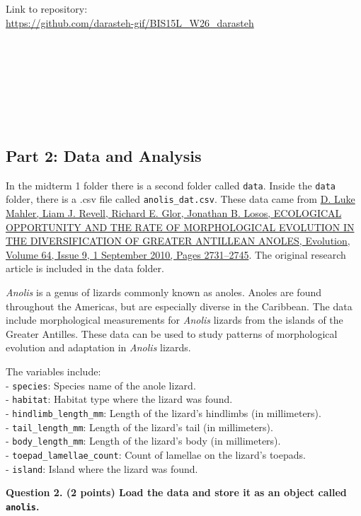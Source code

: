 \documentclass[
]{article}
\begin{document}
Link to repository:\\
\url{https://github.com/darasteh-gif/BIS15L_W26_darasteh}\strut \\
\strut \\
\strut \\
\strut \\

\subsection{Part 2: Data and Analysis}\label{part-2-data-and-analysis}

In the midterm 1 folder there is a second folder called \texttt{data}.
Inside the \texttt{data} folder, there is a .csv file called
\texttt{anolis\_dat.csv}. These data came from
\href{https://academic.oup.com/evolut/article/64/9/2731/6854302?login=true}{D.
Luke Mahler, Liam J. Revell, Richard E. Glor, Jonathan B. Losos,
ECOLOGICAL OPPORTUNITY AND THE RATE OF MORPHOLOGICAL EVOLUTION IN THE
DIVERSIFICATION OF GREATER ANTILLEAN ANOLES, Evolution, Volume 64, Issue
9, 1 September 2010, Pages 2731--2745}. The original research article is
included in the data folder.

\emph{Anolis} is a genus of lizards commonly known as anoles. Anoles are
found throughout the Americas, but are especially diverse in the
Caribbean. The data include morphological measurements for \emph{Anolis}
lizards from the islands of the Greater Antilles. These data can be used
to study patterns of morphological evolution and adaptation in
\emph{Anolis} lizards.

The variables include:\\
- \texttt{species}: Species name of the anole lizard.\\
- \texttt{habitat}: Habitat type where the lizard was found.\\
- \texttt{hindlimb\_length\_mm}: Length of the lizard's hindlimbs (in
millimeters).\\
- \texttt{tail\_length\_mm}: Length of the lizard's tail (in
millimeters).\\
- \texttt{body\_length\_mm}: Length of the lizard's body (in
millimeters).\\
- \texttt{toepad\_lamellae\_count}: Count of lamellae on the lizard's
toepads.\\
- \texttt{island}: Island where the lizard was found.

\textbf{Question 2. (2 points) Load the data and store it as an object
called \texttt{anolis}.}\\
\strut \\
\end{document}

